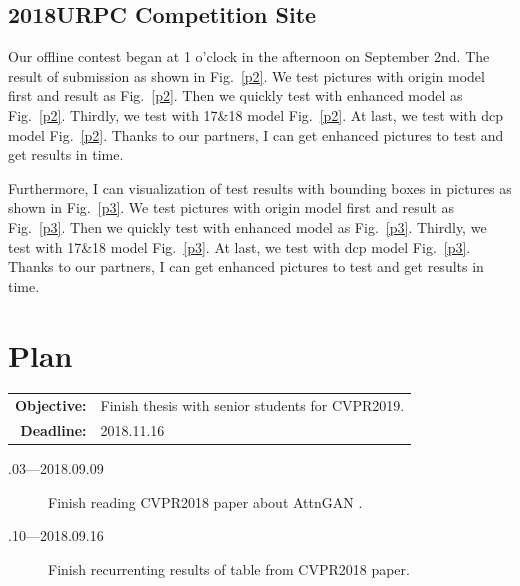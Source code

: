 \documentclass[a4paper]{article}
\begin{document}
	
	\subsection{2018URPC Competition Site}
	
	Our offline contest began at 1 o'clock in the afternoon on September 2nd. The result of submission as shown in Fig.~\ref{p2}. We test pictures with origin model first and result as Fig.~\ref{p2}. Then we quickly test with enhanced model as Fig.~\ref{p2}. Thirdly, we test with 17\&18 model Fig.~\ref{p2}. At last, we test with dcp model Fig.~\ref{p2}. Thanks to our partners, I can get enhanced pictures to test and get results in time.
	
	Furthermore, I can visualization of test results with bounding boxes in pictures as shown in Fig.~\ref{p3}. We test pictures with origin model first and result as Fig.~\ref{p3}. Then we quickly test with enhanced model as Fig.~\ref{p3}. Thirdly, we test with 17\&18 model Fig.~\ref{p3}. At last, we test with dcp model Fig.~\ref{p3}. Thanks to our partners, I can get enhanced pictures to test and get results in time.
		
	\section{Plan}
	
	\begin{tabular}{rl}
		\textbf{Objective:} & Finish thesis with senior students for CVPR2019.\\
		\textbf{Deadline:} & 2018.11.16
	\end{tabular}
	
	\begin{description}
		\item[.03---2018.09.09] Finish reading CVPR2018 paper about AttnGAN \cite{Tao18attngan}.
		\item[.10---2018.09.16] Finish recurrenting results of table from CVPR2018 paper.
	\end{description}
	
	
	
	
\end{document}
